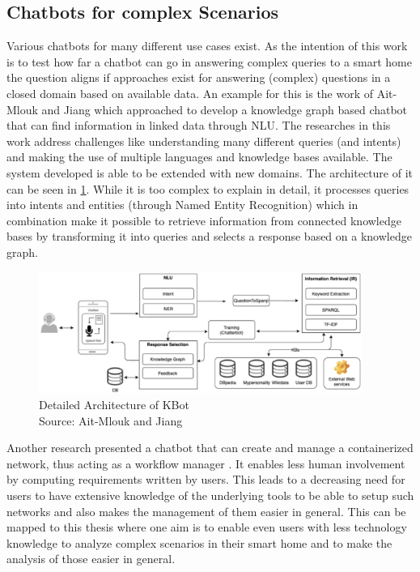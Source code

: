 \subsection{Chatbots for complex Scenarios}
Various chatbots for many different use cases exist. 
As the intention of this work is to test how far a chatbot can go in answering complex queries to a smart home the question aligns if approaches exist for answering (complex) questions in a closed domain based on available data.
An example for this is the work of Ait-Mlouk and Jiang \cite{ait-mlouk_kbot_2020} which approached to develop a knowledge graph based chatbot that can find information in linked data through NLU.
The researches in this work address challenges like understanding many different queries (and intents) and making the use of multiple languages and knowledge bases available.
The system developed is able to be extended with new domains.
The architecture of it can be seen in \cref{fig:kbot}.
While it is too complex to explain in detail, it processes queries into intents and entities (through Named Entity Recognition) which in combination make it possible to retrieve information from connected knowledge bases by transforming it into queries and selects a response based on a knowledge graph.

\begin{figure}[h]
\centering
\includegraphics[width=0.94\textwidth]{graphics/KBot-architecture.png}
\caption{Detailed Architecture of KBot \\Source: Ait-Mlouk and Jiang \cite{ait-mlouk_kbot_2020}}
\label{fig:kbot}
\end{figure}

Another research presented a chatbot that can create and manage a containerized network, thus acting as a workflow manager \cite{jasinski_chatbot-based_2023}.
It enables less human involvement by computing requirements written by users.
This leads to a decreasing need for users to have extensive knowledge of the underlying tools to be able to setup such networks and also makes the management of them easier in general.
This can be mapped to this thesis where one aim is to enable even users with less technology knowledge to analyze complex scenarios in their smart home and to make the analysis of those easier in general.

